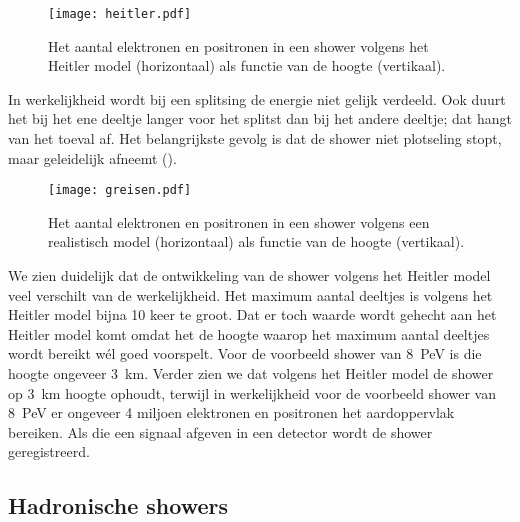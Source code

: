 \begin{figure}
    \centering
    \texttt{[image: heitler.pdf]}
    \caption{Het aantal elektronen en positronen in een shower volgens
             het Heitler model (horizontaal) als functie van de hoogte
             (vertikaal).}
    \label{fig:heitler}
\end{figure}

In werkelijkheid wordt bij een splitsing de energie niet gelijk
verdeeld. Ook duurt het bij het ene deeltje langer voor het splitst dan
bij het andere deeltje; dat hangt van het toeval af. Het belangrijkste
gevolg is dat de shower niet plotseling stopt, maar geleidelijk afneemt
().

\begin{figure}
    \centering
    \texttt{[image: greisen.pdf]}
    \caption{Het aantal elektronen en positronen in een shower volgens
             een realistisch model (horizontaal) als functie van de
             hoogte (vertikaal).}
    \label{fig:greisen}
\end{figure}

We zien duidelijk dat de ontwikkeling van de shower volgens het Heitler
model veel verschilt van de werkelijkheid. Het maximum aantal deeltjes
is volgens het Heitler model bijna 10 keer te groot. Dat er toch waarde
wordt gehecht aan het Heitler model komt omdat het de hoogte waarop het
maximum aantal deeltjes wordt bereikt wél goed voorspelt. Voor de
voorbeeld shower van \SI{8}{\peta\electronvolt} is die hoogte ongeveer
\SI{3}{\km}. Verder zien we dat volgens het Heitler model de shower op
\SI{3}{\km} hoogte ophoudt, terwijl in werkelijkheid voor de voorbeeld
shower van \SI{8}{\peta\electronvolt} er ongeveer 4 miljoen elektronen
en positronen het aardoppervlak bereiken. Als die een signaal afgeven in
een \hisparc detector wordt de shower geregistreerd.


\subsection{Hadronische showers}

